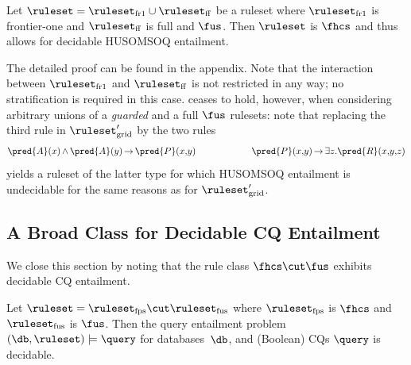 \begin{proposition}\label{prop:frone-fusddl}
	Let $\ruleset = \ruleset_{\smash{\mathrm{fr1}}} \cup \ruleset_{\smash{\mathrm{ff}}}$ be a ruleset where $\ruleset_{\smash{\mathrm{fr1}}}$ is frontier-one and $\ruleset_{\smash{\mathrm{ff}}}$ is full and $\fus$. Then $\ruleset$ is $\fhcs$ and thus allows for decidable HUSOMSOQ entailment.  
\end{proposition}
%
The detailed proof can be found in the appendix. Note that the interaction between $\ruleset_{\smash{\mathrm{fr1}}}$ and $\ruleset_{\smash{\mathrm{ff}}}$ is not restricted in any way; no stratification is required in this case.
%
 ceases to hold, however, when considering arbitrary unions of a \emph{guarded} and a full $\fus$ rulesets: note that replacing the third rule in $\ruleset'_{\smash{\mathrm{grid}}}$ 
by the two rules 
$$ 
\pred{A}(x) {\,\wedge\,} \pred{A}(y) {\,\to\,} \pred{P}(x,\!y)
\qquad\qquad\qquad 
\pred{P}(x,\!y) {\,\to\,} \exists z. \pred{R}(x,\!y,\!z)
$$%
yields a ruleset of the latter type for which HUSOMSOQ entailment is undecidable for the same reasons as for $\ruleset'_{\smash{\mathrm{grid}}}$. 


\subsection{A Broad Class for Decidable CQ Entailment}
%
We close this section by noting that the rule class $\fhcs \cut \fus$ exhibits decidable CQ entailment.

\begin{proposition}\label{thm:fcs-fus-decidable}
	Let $\ruleset = \ruleset_\mathrm{fps} \cut \ruleset_\mathrm{fus}$ where $\ruleset_\mathrm{fps}$ is $\fhcs$ and $\ruleset_\mathrm{fus}$ is $\fus$. Then the query entailment problem $(\db,\ruleset) \models \query$ for databases~$\db$, and (Boolean) CQs $\query$ is decidable.
\end{proposition}

